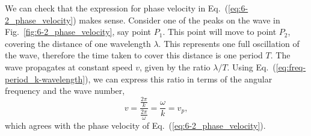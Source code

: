 We can check that the expression for phase velocity in Eq.~(\ref{eq:6-2_phase_velocity}) makes sense.
Consider one of the peaks on the wave in Fig.~\ref{fig:6-2_phase_velocity}, say point $P_1$.
This point will move to point $P_2$, covering the distance of one wavelength $\lambda$.
This represents one full oscillation of the wave, therefore the time taken to cover this distance is one period $T$.
The wave propagates at constant speed $v$, given by the ratio $\lambda/T$.
Using Eq.~(\ref{eq:freq-period_k-wavelength}), we can express this ratio in terms of the angular frequency and the wave number,
\begin{equation}
    v = \frac{\frac{2\pi}{k}}{\frac{2\pi}{\omega}} = \frac{\omega}{k} = v_p,
\end{equation}
which agrees with the phase velocity of Eq.~(\ref{eq:6-2_phase_velocity}).

